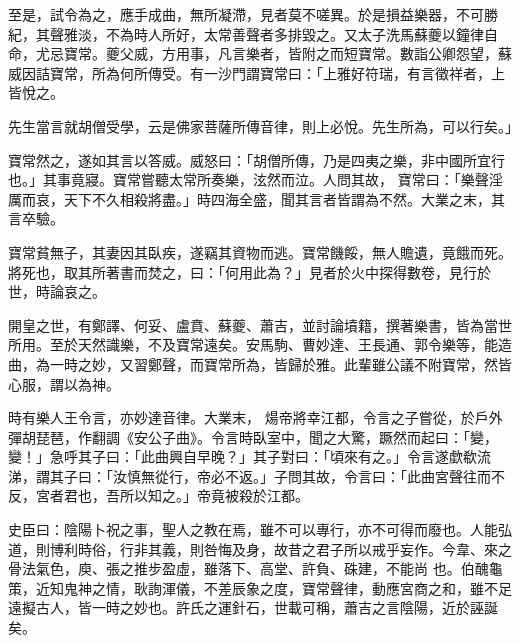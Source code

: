 \begin{pinyinscope}
 至是，試令為之，應手成曲，無所凝滯，見者莫不嗟異。於是損益樂器，不可勝紀，其聲雅淡，不為時人所好，太常善聲者多排毀之。又太子洗馬蘇夔以鐘律自命，尤忌寶常。夔父威，方用事，凡言樂者，皆附之而短寶常。數詣公卿怨望，蘇威因詰寶常，所為何所傳受。有一沙門謂寶常曰：「上雅好符瑞，有言徵祥者，上皆悅之。



 先生當言就胡僧受學，云是佛家菩薩所傳音律，則上必悅。先生所為，可以行矣。」



 寶常然之，遂如其言以答威。威怒曰：「胡僧所傳，乃是四夷之樂，非中國所宜行也。」其事竟寢。寶常嘗聽太常所奏樂，泫然而泣。人問其故，
 寶常曰：「樂聲淫厲而哀，天下不久相殺將盡。」時四海全盛，聞其言者皆謂為不然。大業之末，其言卒驗。



 寶常貧無子，其妻因其臥疾，遂竊其資物而逃。寶常饑餒，無人贍遺，竟餓而死。將死也，取其所著書而焚之，曰：「何用此為？」見者於火中探得數卷，見行於世，時論哀之。



 開皇之世，有鄭譯、何妥、盧賁、蘇夔、蕭吉，並討論墳籍，撰著樂書，皆為當世所用。至於天然識樂，不及寶常遠矣。安馬駒、曹妙達、王長通、郭令樂等，能造曲，為一時之妙，又習鄭聲，而寶常所為，皆歸於雅。此輩雖公議不附寶常，然皆心服，謂以為神。



 時有樂人王令言，亦妙達音律。大業末，
 煬帝將幸江都，令言之子嘗從，於戶外彈胡琵琶，作翻調《安公子曲》。令言時臥室中，聞之大驚，蹶然而起曰：「變，變！」急呼其子曰：「此曲興自早晚？」其子對曰：「頃來有之。」令言遂歔欷流涕，謂其子曰：「汝慎無從行，帝必不返。」子問其故，令言曰：「此曲宮聲往而不反，宮者君也，吾所以知之。」帝竟被殺於江都。



 史臣曰：陰陽卜祝之事，聖人之教在焉，雖不可以專行，亦不可得而廢也。人能弘道，則博利時俗，行非其義，則咎悔及身，故昔之君子所以戒乎妄作。今韋、來之骨法氣色，庾、張之推步盈虛，雖落下、高堂、許負、硃建，不能尚
 也。伯醜龜策，近知鬼神之情，耿詢渾儀，不差辰象之度，寶常聲律，動應宮商之和，雖不足遠擬古人，皆一時之妙也。許氏之運針石，世載可稱，蕭吉之言陰陽，近於誣誕矣。



\end{pinyinscope}